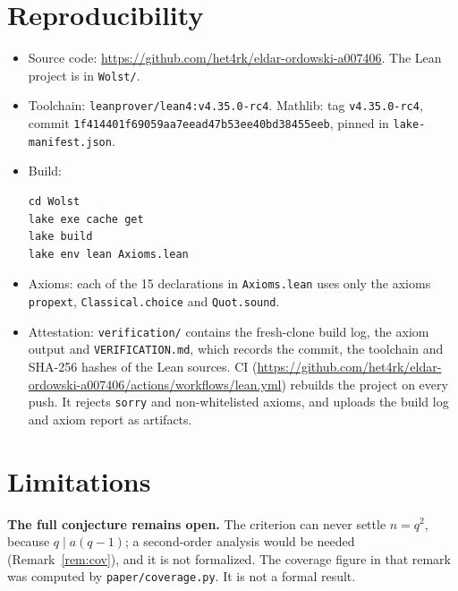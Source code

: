 \documentclass[11pt]{article}
\theoremstyle{remark}\newtheorem{remark}[theorem]{Remark}
\begin{document}
\section{Reproducibility}
\begin{itemize}
\item Source code: \url{https://github.com/het4rk/eldar-ordowski-a007406}. The Lean project is in \texttt{Wolst/}.
\item Toolchain: \texttt{leanprover/lean4:v4.35.0-rc4}. Mathlib: tag \texttt{v4.35.0-rc4}, commit \nolinkurl{1f414401f69059aa7eead47b53ee40bd38455eeb}, pinned in \texttt{lake-manifest.json}.
\item Build:
\begin{verbatim}
cd Wolst
lake exe cache get
lake build
lake env lean Axioms.lean
\end{verbatim}

\item Axioms: each of the 15 declarations in \texttt{Axioms.lean} uses only the axioms \texttt{propext}, \texttt{Classical.choice} and \texttt{Quot.sound}.
\item Attestation: \texttt{verification/} contains the fresh-clone build log, the axiom output and \texttt{VERIFICATION.md}, which records the commit, the toolchain and SHA-256 hashes of the Lean sources. CI (\url{https://github.com/het4rk/eldar-ordowski-a007406/actions/workflows/lean.yml}) rebuilds the project on every push. It rejects \texttt{sorry} and non-whitelisted axioms, and uploads the build log and axiom report as artifacts.
\end{itemize}

\section{Limitations}
\textbf{The full conjecture remains open.} The criterion can never settle $n=q^2$, because $q\mid a(q-1)$; a second-order analysis would be needed (Remark~\ref{rem:cov}), and it is not formalized. The coverage figure in that remark was computed by \texttt{paper/coverage.py}. It is not a formal result.
\end{document}
